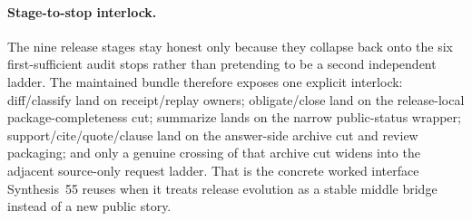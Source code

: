 \documentclass[11pt]{article}
\begin{document}
\paragraph{Stage-to-stop interlock.}
The nine release stages stay honest only because they collapse back onto the six first-sufficient audit stops rather than pretending to be a second independent ladder.
The maintained bundle therefore exposes one explicit interlock: diff/classify land on receipt/replay owners; obligate/close land on the release-local package-completeness cut; summarize lands on the narrow public-status wrapper; support/cite/quote/clause land on the answer-side archive cut and review packaging; and only a genuine crossing of that archive cut widens into the adjacent source-only request ladder.
That is the concrete worked interface Synthesis~55 reuses when it treats release evolution as a stable middle bridge instead of a new public story.\cite{series:releasespine,series:releaseclosure,series:statusenvelopes,series:seriesspines,series:answerdisclosurepackets,series:challengeanswerreviewmenus,series:pairedterminalcutoverrules}
\end{document}

